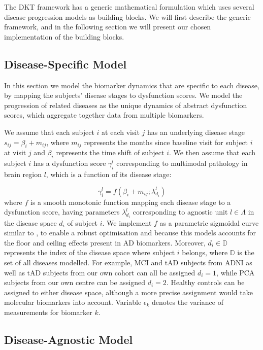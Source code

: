 \documentclass{llncs}
\begin{document}
The DKT framework has a generic mathematical formulation which uses several disease progression models as building blocks. We will first describe the generic framework, and in the following section we will present our chosen implementation of the building blocks. 

\subsection{Disease-Specific Model}

In this section we model the biomarker dynamics that are specific to each disease, by mapping the subjects' disease stages to dysfunction scores. We model the progression of related diseases as the unique dynamics of abstract dysfunction scores, which aggregate together data from multiple biomarkers. 

We assume that each subject $i$ at each visit $j$ has an underlying disease stage $s_{ij} = \beta_i + m_{ij}$, where $m_{ij}$ represents the months since baseline visit for subject $i$ at visit $j$ and $\beta_i$ represents the time shift of subject $i$. We then assume that each subject $i$ has a dysfunction score $\gamma_i^l$ corresponding to multimodal pathology in brain region $l$, which is a function of its disease stage:

\begin{equation}
\label{eqDysfunctionScoreDef}
 \gamma_i^l = f(\beta_i + m_{ij}; \lambda_{d_i}^l)
\end{equation}
where $f$ is a smooth monotonic function mapping each disease stage to a dysfunction score, having parameters $\lambda_{d_i}^l$ corresponding to agnostic unit $l \in \Lambda$ in the disease space $d_i$ of subject $i$. We implement $f$ as a parametric sigmoidal curve similar to \cite{jedynak2012computational}, to enable a robust optimisation and because this models accounts for the floor and ceiling effects present in AD biomarkers. Moreover, $d_i \in \mathbb{D}$ represents the index of the disease space where subject $i$ belongs, where $\mathbb{D}$ is the set of all diseases modelled. For example, MCI and tAD subjects from ADNI as well as tAD subjects from our own cohort can all be assigned $d_i=1$, while PCA subjects from our own centre can be assigned $d_i=2$. Healthy controls can be assigned to either disease space, although a more precise assignment would take molecular biomarkers into account. Variable $\epsilon_k$ denotes the variance of measurements for biomarker $k$. 

\subsection{Disease-Agnostic Model}
\end{document}
